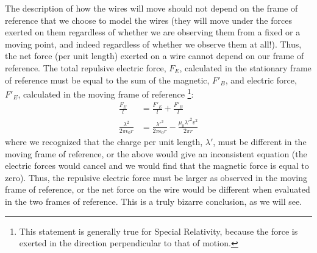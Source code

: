 The description of how the wires will move should not depend on the frame of reference that we choose to model the wires (they will move under the forces exerted on them regardless of whether we are observing them from a fixed or a moving point, and indeed regardless of whether we observe them at all!). Thus, the net force (per unit length) exerted on a wire cannot depend on our frame of reference. The total repulsive electric force, $F_E$, calculated in the stationary frame of reference must be equal to the sum of the magnetic, $F'_B$, and electric force, $F'_E$, calculated in the moving frame of reference \footnote{This statement is generally true for Special Relativity, because the force is exerted in the direction perpendicular to that of motion.}:
\begin{align*}
\frac{F_E}{l}&=\frac{F'_E}{l}+\frac{F'_B}{l}\\
\frac{\lambda^2}{2\pi \epsilon_0r}&=\frac{\lambda'^2}{2\pi \epsilon_0r}  -\frac{\mu_0 \lambda'^2 v^2}{2\pi r}
\end{align*}
where we recognized that the charge per unit length, $\lambda'$, must be different in the moving frame of reference, or the above would give an inconsistent equation (the electric forces would cancel and we would find that the magnetic force is equal to zero). Thus, the repulsive electric force must be larger as observed in the moving frame of reference, or the net force on the wire would be different when evaluated in the two frames of reference. This is a truly bizarre conclusion, as we will see.

